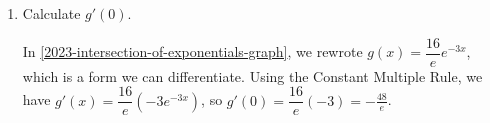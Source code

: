 \documentclass{article}
\theoremstyle{theorem}
\begin{document}
\begin{enumerate}
\begin{enumerate}
  \item
    \begin{problem}[\nstretch{0.25}]
      Calculate $g'(0)$. 
    \end{problem}

    \begin{solution}
      In \ref{2023-intersection-of-exponentials-graph}, we rewrote $g(x) = \dfrac{16}{e} e^{-3x}$, which is a form we can differentiate. Using the Constant Multiple Rule, we have $g'(x) = \dfrac{16}{e} (-3 e^{-3x})$, so $g'(0) = \dfrac{16}{e} (-3) = \boxed{ - \frac{48}{e}}$. 
    \end{solution}

  \end{enumerate}

\end{enumerate}
\end{document}
